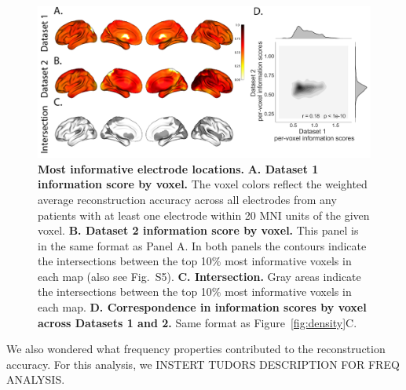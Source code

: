 \documentclass[11pt]{article}
\newcommand{\intersectmap}{S5}
\begin{document}
\begin{figure}
  \centering
  \includegraphics[width=\textwidth]{figs/informap}
  \caption{\textbf{Most informative electrode locations.}
    \textbf{A. Dataset 1 information score by voxel.} The voxel colors
    reflect the weighted average reconstruction accuracy across all
    electrodes from any patients with at least one electrode within 20
    MNI units of the given voxel.  \textbf{B. Dataset 2 information
      score by voxel.}  This panel is in the same format as Panel A.
    In both panels the contours indicate the intersections between the
    top 10\% most informative voxels in each map (also see
    Fig.~\intersectmap).  \textbf{C. Intersection.}  
    Gray areas indicate the intersections between the
    top 10\% most informative voxels in each map.  \textbf{D. Correspondence in information
      scores by voxel across Datasets 1 and 2.}  Same format as
    Figure~\ref{fig:density}C.}
  \label{fig:informap}
\end{figure}

We also wondered what frequency properties contributed to the
reconstruction accuracy.  For this analysis, we INSTERT TUDORS
DESCRIPTION FOR FREQ ANALYSIS.
\end{document}
